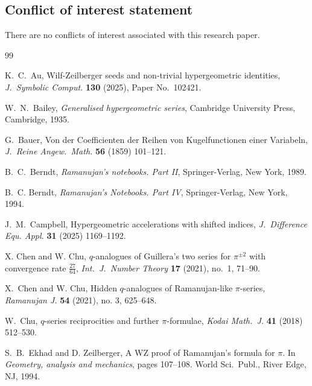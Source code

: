 \documentclass[12pt]{article}
\begin{document}
\subsection*{Conflict of interest statement}
 There are no conflicts of interest associated with this research paper. 

\begin{thebibliography}{99}

 K.\ C.\ Au, 
 Wilf-{Z}eilberger seeds and non-trivial hypergeometric identities, 
 \emph{J.\ Symbolic Comput.} {\bf 130} (2025), 
 Paper No.\ 102421. 

 W.\ N.\ Bailey, 
 {\it Generalised hypergeometric series}, 
 Cambridge University Press, Cambridge, 1935. 

 G.\ Bauer, 
 Von der Coefficienten der Reihen von Kugelfunctionen einer Variabeln, 
 {\it J.\ Reine Angew.\ Math.} {\bf 56} (1859) 101--121. 

 B.\ C.\ Berndt, 
 {\it Ramanujan's notebooks. {P}art {II}}, 
 Springer-Verlag, New York, 1989. 

 B.\ C. Berndt, 
 {\it Ramanujan's Notebooks. {P}art {IV}}, 
 Springer-Verlag, New York, 1994. 

 J.\ M.\ Campbell, 
 Hypergeometric accelerations with shifted indices, 
 {\it J.\ Difference Equ. Appl.} {\bf 31} (2025) 1169--1192. 

 X. Chen and W. Chu, 
 {$q$}-analogues of {G}uillera's two series for {$\pi^{\pm 2}$} with convergence rate {$\frac{27}{64}$}, 
 \emph{Int.\ J.\ Number Theory} {\bf 17} (2021), no.\ 1, 
 71--90. 

 X.\ Chen and W. Chu, 
 Hidden {$q$}-analogues of {R}amanujan-like {$\pi$}-series, 
 \emph{Ramanujan J.} {\bf 54} (2021), no. 3, 
 625--648. 

 W.\ Chu, 
 {$q$}-series reciprocities and further {$\pi$}-formulae, 
 {\it Kodai Math.\ J.} {\bf 41} (2018) 512--530. 

 S.\ B.\ Ekhad and D. Zeilberger, 
 A {WZ} proof of {R}amanujan's formula for {$\pi$}. 
 In \emph{Geometry, analysis and mechanics}, 
 pages 107--108. World Sci.\ Publ., River Edge, NJ, 1994. 


\end{thebibliography}
\end{document}
